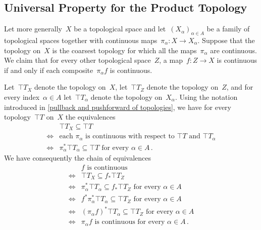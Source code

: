 \subsection{Universal Property for the Product Topology}

Let more generally~$X$ be a topological space and let~$(X_α)_{α ∈ A}$ be a family of topological spaces together with continuous maps~$π_α \colon X \to X_α$.
Suppose that the topology on~$X$ is the coarsest topology for which all the maps~$π_α$ are continuous.
We claim that for every other topological space~$Z$, a map~$f \colon Z \to X$ is continuous if and only if each composite~$π_α f$ is continuous.

Let~$\top{T}_X$ denote the topology on~$X$, let~$\top{T}_Z$ denote the topology on~$Z$, and for every index~$α ∈ A$ let~$\top{T}_α$ denote the topology on~$X_α$.
Using the notation introduced in \cref{pullback and pushforward of topologies}, we have for every topology~$\top{T}$ on~$X$ the equivalences
\begin{align*}
	{}&
	\top{T}_X ⊆ \top{T}
	\\
	\iff{}&
	\text{each~$π_α$ is continuous with respect to~$\top{T}$ and~$\top{T}_α$}
	\\
	\iff{}&
	\text{$π_α^* \top{T}_α ⊆ \top{T}$ for every~$α ∈ A$} \,.
\end{align*}
We have consequently the chain of equivalences
\begin{align*}
	{}&
	\text{$f$ is continuous} \\
	\iff{}&
	\top{T}_X ⊆ f_* \top{T}_Z \\
	\iff{}&
	\text{$π_α^* \top{T}_α ⊆ f_* \top{T}_Z$ for every~$α ∈ A$} \\
	\iff{}&
	\text{$f^* π_α^* \top{T}_α ⊆ \top{T}_Z$ for every~$α ∈ A$} \\
	\iff{}&
	\text{$(π_α f)^* \top{T}_α ⊆ \top{T}_Z$ for every~$α ∈ A$} \\
	\iff{}&
	\text{$π_α f$ is continuous for every~$α ∈ A$} \,.
\end{align*}
